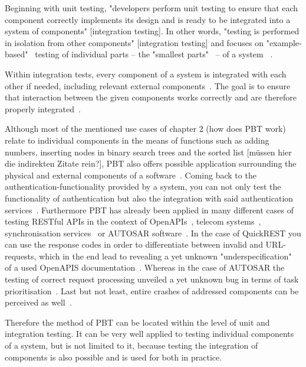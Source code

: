 \documentclass[runningheads]{llncs}
\begin{document}
Beginning with unit testing, "developers perform unit testing to ensure that each component correctly implements its design and is ready to be integrated into a system of components" [integration testing]. In other words, "testing is performed in isolation from other components" [integration testing] and focuses on "example-based"~\cite{Corgozinho2023} testing of individual parts -- the "smallest parts"~\cite{Aniche2022} -- of a system ~\cite{Hartmann2000,Corgozinho2023}.

Within integration tests, every component of a system is integrated with each other if needed, including relevant external components~\cite{Aniche2022,Hartmann2000,Radziwill2020}. The goal is to ensure that interaction between the given components works correctly and are therefore properly integrated~\cite{Hartmann2000,Aniche2022}.

Although most of the mentioned use cases of chapter 2 (how does PBT work) relate to individual components in the means of functions such as adding numbers, inserting nodes in binary search trees and the sorted list [müssen hier die indirekten Zitate rein?], PBT also offers possible application surrounding the physical and external components of a software~\cite{Chen2022}. Coming back to the authentication-functionality provided by a system, you can not only test the functionality of authentication but also the integration with said authentication services~\cite{Fink1997}. Furthermore PBT has already been applied in many different cases of testing RESTful APIs in the context of OpenAPIs~\cite{Karlsson2019}, telecom systems~\cite{Arts2006}, synchronisation services~\cite{Hughes2016} or AUTOSAR software~\cite{Arts2015}. In the case of QuickREST you can use the response codes in order to differentiate between invalid and URL-requests, which in the end lead to revealing a yet unknown "underspecification"~\cite{Karlsson2019} of a used OpenAPIS documentation~\cite{Karlsson2019}. Whereas in the case of AUTOSAR the testing of correct request processing unveiled a yet unknown bug in terms of task prioritisation~\cite{Arts2015}. Last but not least, entire crashes of addressed components can be perceived as well~\cite{Arts2006}.

Therefore the method of PBT can be located within the level of unit and  integration testing. It can be very well applied to testing individual components of a system, but is not limited to it, because testing the integration of components is also possible and is used for both in practice.
\end{document}
